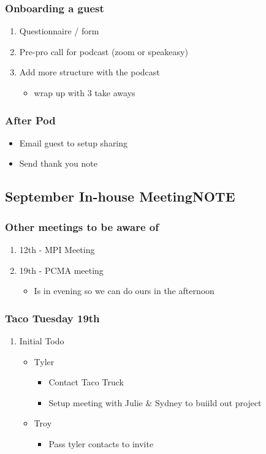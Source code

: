 \documentclass[11pt]{article}
\begin{document}
\subsubsection{Onboarding a guest}
\label{sec:org283523c}
\begin{enumerate}
\item Questionnaire / form
\item Pre-pro call for podcast (zoom or speakeasy)
\item Add more structure with the podcast
\begin{itemize}
\item wrap up with 3 take aways
\end{itemize}
\end{enumerate}

\subsubsection{After Pod}
\label{sec:orga952bc6}
\begin{itemize}
\item Email guest to setup sharing
\item Send thank you note
\end{itemize}

\subsection{September In-house Meeting\hfill{}\textsc{NOTE}}
\label{sec:org514629b}
\subsubsection{Other meetings to be aware of}
\label{sec:org65c46cb}
\begin{enumerate}
\item 12th - MPI Meeting
\label{sec:org9e0a781}
\item 19th - PCMA meeting
\label{sec:org3fb67f9}
\begin{itemize}
\item Is in evening so we can do ours in the afternoon
\end{itemize}
\end{enumerate}
\subsubsection{Taco Tuesday 19th}
\label{sec:orgba45970}
\begin{enumerate}
\item Initial Todo
\label{sec:org6d336ef}
\begin{itemize}
\item Tyler 
\begin{itemize}
\item Contact Taco Truck
\item Setup meeting with Julie \& Sydney to buiild out project
\end{itemize}
\item Troy
\begin{itemize}
\item Pass tyler contacts to invite
\end{itemize}
\end{itemize}
\end{enumerate}
\end{document}
